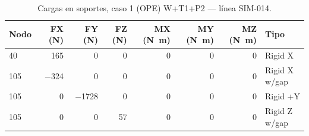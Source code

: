 \begin{table}[htbp]
  \centering
  \footnotesize
  \caption{Cargas en soportes, caso 1 (OPE) W+T1+P2 — línea SIM-014.}
  \label{tab:restricciones-ope}
  \begin{tabular}{lrrrrrrl}
    \toprule
    Nodo & FX (\si{N}) & FY (\si{N}) & FZ (\si{N}) & MX (\si{N.m}) & MY (\si{N.m}) & MZ (\si{N.m}) & Tipo \\
    \midrule
    40 & \num{165} & \num{0} & \num{0} & \num{0} & \num{0} & \num{0} & Rigid X \\
    105 & \num{-324} & \num{0} & \num{0} & \num{0} & \num{0} & \num{0} & Rigid X w/gap \\
    105 & \num{0} & \num{-1728} & \num{0} & \num{0} & \num{0} & \num{0} & Rigid +Y \\
    105 & \num{0} & \num{0} & \num{57} & \num{0} & \num{0} & \num{0} & Rigid Z w/gap \\
    \bottomrule
  \end{tabular}
\end{table}

